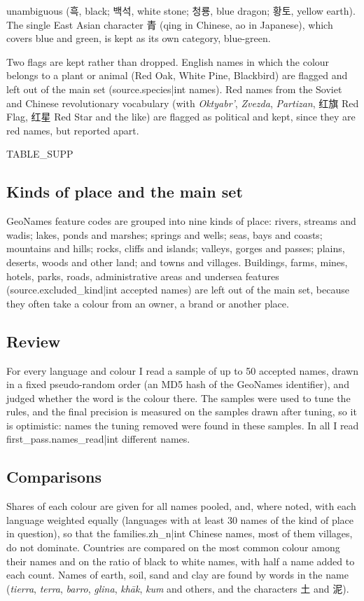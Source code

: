 \documentclass[11pt,a4paper]{article}
\begin{document}
unambiguous ({\cjk 흑}, black; {\cjk 백석}, white stone; {\cjk 청룡}, blue dragon; {\cjk 황토}, yellow earth). The single East Asian character {\cjk 青} (qing in Chinese, ao in Japanese), which covers blue and green, is kept as its own category, blue-green.

Two flags are kept rather than dropped. English names in which the colour belongs to a plant or animal (Red Oak, White Pine, Blackbird) are flagged and left out of the main set ({{source.species|int}} names). Red names from the Soviet and Chinese revolutionary vocabulary (with \textit{Oktyabr'}, \textit{Zvezda}, \textit{Partizan}, {\cjk 红旗} Red Flag, {\cjk 红星} Red Star and the like) are flagged as political and kept, since they are red names, but reported apart.

{{TABLE_SUPP}}

\subsection{Kinds of place and the main set}
GeoNames feature codes are grouped into nine kinds of place: rivers, streams and wadis; lakes, ponds and marshes; springs and wells; seas, bays and coasts; mountains and hills; rocks, cliffs and islands; valleys, gorges and passes; plains, deserts, woods and other land; and towns and villages. Buildings, farms, mines, hotels, parks, roads, administrative areas and undersea features ({{source.excluded_kind|int}} accepted names) are left out of the main set, because they often take a colour from an owner, a brand or another place.

\subsection{Review}
For every language and colour I read a sample of up to 50 accepted names, drawn in a fixed pseudo-random order (an MD5 hash of the GeoNames identifier), and judged whether the word is the colour there. The samples were used to tune the rules, and the final precision is measured on the samples drawn after tuning, so it is optimistic: names the tuning removed were found in these samples. In all I read {{first_pass.names_read|int}} different names.

\subsection{Comparisons}
Shares of each colour are given for all names pooled, and, where noted, with each language weighted equally (languages with at least 30 names of the kind of place in question), so that the {{families.zh_n|int}} Chinese names, most of them villages, do not dominate. Countries are compared on the most common colour among their names and on the ratio of black to white names, with half a name added to each count. Names of earth, soil, sand and clay are found by words in the name (\textit{tierra}, \textit{terra}, \textit{barro}, \textit{glina}, \textit{khāk}, \textit{kum} and others, and the characters {\cjk 土} and {\cjk 泥}).
\end{document}
